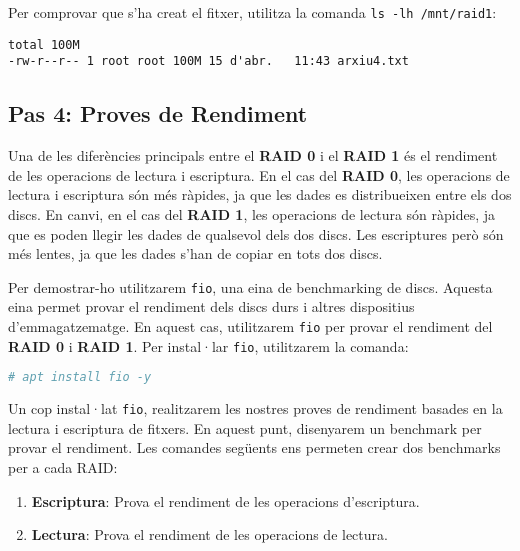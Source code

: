 Per comprovar que s'ha creat el fitxer, utilitza la comanda \texttt{ls -lh /mnt/raid1}:

\begin{terminaloutput}
\footnotesize\begin{verbatim}
total 100M
-rw-r--r-- 1 root root 100M 15 d'abr.   11:43 arxiu4.txt
\end{verbatim}
\end{terminaloutput}

\subsection{Pas 4: Proves de Rendiment}\label{pas-4-proves-de-rendiment}

Una de les diferències principals entre el \textbf{RAID 0} i el \textbf{RAID 1} és el rendiment de les operacions de lectura i escriptura. En el cas del \textbf{RAID 0}, les operacions de lectura i escriptura són més ràpides, ja que les dades es distribueixen entre els dos discs. En canvi, en el cas del \textbf{RAID 1}, les operacions de lectura són ràpides, ja que es poden llegir les dades de qualsevol dels dos discs. Les escriptures però són més lentes, ja que les dades s'han de copiar en tots dos discs.

Per demostrar-ho utilitzarem \texttt{fio}, una eina de benchmarking de discs. Aquesta eina permet provar el rendiment dels discs durs i altres dispositius d'emmagatzematge. En aquest cas, utilitzarem \texttt{fio} per provar el rendiment del \textbf{RAID 0} i \textbf{RAID 1}. Per instal·lar \texttt{fio}, utilitzarem la comanda:

\begin{lstlisting}[language=bash, numbers=none, commentstyle=\color{black}]
# apt install fio -y
\end{lstlisting}

Un cop instal·lat \texttt{fio}, realitzarem les nostres proves de rendiment basades en la lectura i escriptura de fitxers. En aquest punt, disenyarem un benchmark per provar el rendiment. Les comandes següents ens permeten crear dos benchmarks per a cada RAID: 

\begin{enumerate}
        \item \textbf{Escriptura}: Prova el rendiment de les operacions d'escriptura.
        \item \textbf{Lectura}: Prova el rendiment de les operacions de lectura.
\end{enumerate}

